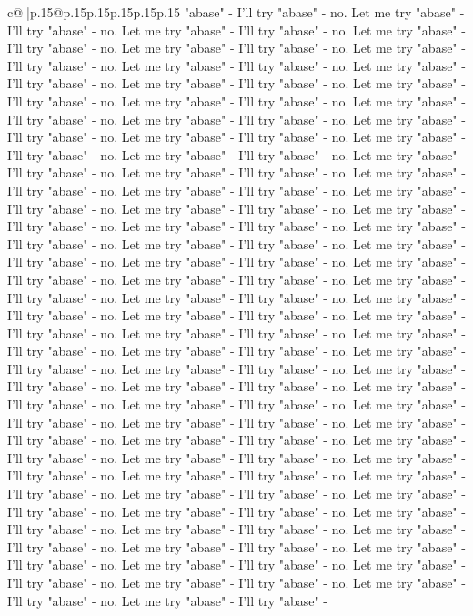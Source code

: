 \documentclass{article}
\begin{document}
{\begin{supertabular}{c@{$\;$}|p{.15\linewidth}@{}p{.15\linewidth}p{.15\linewidth}p{.15\linewidth}p{.15\linewidth}p{.15\linewidth}}
{{{"abase" {-} I'll try "abase" {-} no. Let me try "abase" {-} I'll try "abase" {-} no. Let me try "abase" {-} I'll try "abase" {-} no. Let me try "abase" {-} I'll try "abase" {-} no. Let me try "abase" {-} I'll try "abase" {-} no. Let me try "abase" {-} I'll try "abase" {-} no. Let me try "abase" {-} I'll try "abase" {-} no. Let me try "abase" {-} I'll try "abase" {-} no. Let me try "abase" {-} I'll try "abase" {-} no. Let me try "abase" {-} I'll try "abase" {-} no. Let me try "abase" {-} I'll try "abase" {-} no. Let me try "abase" {-} I'll try "abase" {-} no. Let me try "abase" {-} I'll try "abase" {-} no. Let me try "abase" {-} I'll try "abase" {-} no. Let me try "abase" {-} I'll try "abase" {-} no. Let me try "abase" {-} I'll try "abase" {-} no. Let me try "abase" {-} I'll try "abase" {-} no. Let me try "abase" {-} I'll try "abase" {-} no. Let me try "abase" {-} I'll try "abase" {-} no. Let me try "abase" {-} I'll try "abase" {-} no. Let me try "abase" {-} I'll try "abase" {-} no. Let me try "abase" {-} I'll try "abase" {-} no. Let me try "abase" {-} I'll try "abase" {-} no. Let me try "abase" {-} I'll try "abase" {-} no. Let me try "abase" {-} I'll try "abase" {-} no. Let me try "abase" {-} I'll try "abase" {-} no. Let me try "abase" {-} I'll try "abase" {-} no. Let me try "abase" {-} I'll try "abase" {-} no. Let me try "abase" {-} I'll try "abase" {-} no. Let me try "abase" {-} I'll try "abase" {-} no. Let me try "abase" {-} I'll try "abase" {-} no. Let me try "abase" {-} I'll try "abase" {-} no. Let me try "abase" {-} I'll try "abase" {-} no. Let me try "abase" {-} I'll try "abase" {-} no. Let me try "abase" {-} I'll try "abase" {-} no. Let me try "abase" {-} I'll try "abase" {-} no. Let me try "abase" {-} I'll try "abase" {-} no. Let me try "abase" {-} I'll try "abase" {-} no. Let me try "abase" {-} I'll try "abase" {-} no. Let me try "abase" {-} I'll try "abase" {-} no. Let me try "abase" {-} I'll try "abase" {-} no. Let me try "abase" {-} I'll try "abase" {-} no. Let me try "abase" {-} I'll try "abase" {-} no. Let me try "abase" {-} I'll try "abase" {-} no. Let me try "abase" {-} I'll try "abase" {-} no. Let me try "abase" {-} I'll try "abase" {-} no. Let me try "abase" {-} I'll try "abase" {-} no. Let me try "abase" {-} I'll try "abase" {-} no. Let me try "abase" {-} I'll try "abase" {-} no. Let me try "abase" {-} I'll try "abase" {-} no. Let me try "abase" {-} I'll try "abase" {-} no. Let me try "abase" {-} I'll try "abase" {-} no. Let me try "abase" {-} I'll try "abase" {-} no. Let me try "abase" {-} I'll try "abase" {-} no. Let me try "abase" {-} I'll try "abase" {-} no. Let me try "abase" {-} I'll try "abase" {-} no. Let me try "abase" {-} I'll try "abase" {-} no. Let me try "abase" {-} I'll try "abase" {-} no. Let me try "abase" {-} I'll try "abase" {-} no. Let me try "abase" {-} I'll try "abase" {-} no. Let me try "abase" {-} I'll try "abase" {-} no. Let me try "abase" {-} I'll try "abase" {-} no. Let me try "abase" {-} I'll try "abase" {-} no. Let me try "abase" {-} I'll try "abase" {-} no. Let me try "abase" {-} I'll try "abase" {-} no. Let me try "abase" {-} I'll try "abase" {-} no. Let me try "abase" {-} I'll try "abase" {-} }}}
\end{supertabular}}
\end{document}
